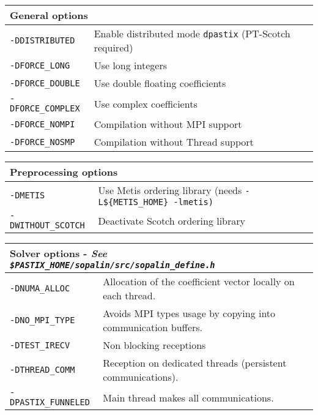 \documentclass{article}
\newenvironment{tabIII}{\begin{tabular}{|p{32mm}|p{90mm}|}}{\end{tabular}}
\newcommand*{\tabIIItitle}[1]{\multicolumn{2}{|l|}{#1}}
\begin{document}
\begin{multicols}{2}
  \begin{tabIII}
    \hline
    \tabIIItitle{General options} \\
    \hline
    \texttt{-DDISTRIBUTED}         & Enable distributed mode \texttt{dpastix} (PT-Scotch required)\\
    \texttt{-DFORCE\_LONG}         & Use long integers\\
    \texttt{-DFORCE\_DOUBLE}       & Use double floating coefficients\\
    \texttt{-DFORCE\_COMPLEX}      & Use complex coefficients\\
    \texttt{-DFORCE\_NOMPI}        & Compilation without MPI support\\
    \texttt{-DFORCE\_NOSMP}        & Compilation without Thread support\\
    \hline
  \end{tabIII}

  \begin{tabIII}
    \hline
    \tabIIItitle{Preprocessing options} \\
    \hline
    \texttt{-DMETIS}           & Use Metis ordering library (needs \texttt{-L\$\{METIS\_HOME\} -lmetis)}\\
    \texttt{-DWITHOUT\_SCOTCH} & Deactivate Scotch ordering library\\
    \hline
  \end{tabIII}

  \begin{tabIII}
    \hline
    \tabIIItitle{Solver options - \textit{See \texttt{\$PASTIX\_HOME/sopalin/src/sopalin\_define.h}}}\\
    \hline
    \texttt{-DNUMA\_ALLOC}      & Allocation of the coefficient vector locally on each thread.\\
    \texttt{-DNO\_MPI\_TYPE}    & Avoids MPI types usage by copying into communication buffers.\\
    \texttt{-DTEST\_IRECV}      & Non blocking receptions\\
    \texttt{-DTHREAD\_COMM}     & Reception on dedicated threads (persistent communications).\\
    \texttt{-DPASTIX\_FUNNELED} & Main thread makes all communications.\\
    \hline 
  \end{tabIII}


\end{multicols}
\end{document}
